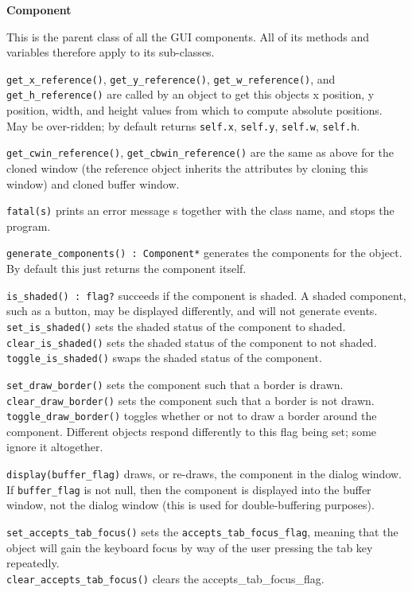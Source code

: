 {\ttfamily\bfseries
{}Component}

This is the parent class of all the GUI components. All of its methods
and variables therefore apply to its sub-classes.

\texttt{get\_x\_reference()}, \texttt{get\_y\_reference()},
\texttt{get\_w\_reference()}, and
\texttt{get\_h\_reference()} are called by an object to get this
object{\textquotesingle}s x position, y position, width, and height
values from which to compute absolute positions. May be over-ridden;
by default returns \texttt{self.x}, \texttt{self.y}, \texttt{self.w},
\texttt{self.h}.

\texttt{get\_cwin\_reference()}, \texttt{get\_cbwin\_reference()} are
the same as above
for the cloned window (the reference object inherits the attributes by
cloning this window) and cloned buffer window.

\texttt{fatal(s)} prints an error message s together with the class name, and
stops the program.

\texttt{generate\_components() : Component*} generates the components for the
object. By default this just returns the component itself.

\texttt{is\_shaded() : flag?} succeeds if the component is shaded. A shaded
component, such as a button, may be displayed differently, and will not
generate events.\\
\texttt{set\_is\_shaded()} sets the shaded status of the component to
shaded.\\
\texttt{clear\_is\_shaded()} sets the shaded status of the component to not
shaded.\\
\texttt{toggle\_is\_shaded()} swaps the shaded status of the component.

\texttt{set\_draw\_border()} sets the component such that a border is
drawn.\\
\texttt{clear\_draw\_border()} sets the component such that a border is not
drawn.\\
\texttt{toggle\_draw\_border()} toggles whether or not to draw a border around
the component. Different objects respond differently to this flag being
set; some ignore it altogether.

\texttt{display(buffer\_flag)} draws, or re-draws, the component in the dialog
window. If \texttt{buffer\_flag} is not null, then the component is displayed
into the buffer window, not the dialog window (this is used for
double-buffering purposes).

\texttt{set\_accepts\_tab\_focus()} sets the
\texttt{accepts\_tab\_focus\_flag}, meaning
that the object will gain the keyboard focus by way of the user
pressing the tab key repeatedly.\\
\texttt{clear\_accepts\_tab\_focus()} clears the accepts\_tab\_focus\_flag.

